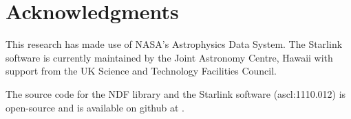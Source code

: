 \documentclass[final,authoryear,5p,times,twocolumn]{elsarticle}
\begin{document}
{\section{Acknowledgments}

This research has made use of NASA's Astrophysics Data System.
The Starlink software is currently maintained by the Joint Astronomy
Centre, Hawaii with support from the UK Science and Technology
Facilities Council.

The source code for the NDF library and the Starlink software
(ascl:1110.012) is open-source and is available on github at
.





}
\end{document}
